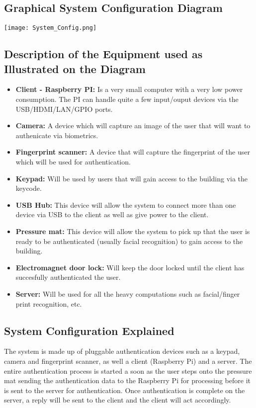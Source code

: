 \subsection{Graphical System Configuration Diagram}

\texttt{[image: System\_Config.png]}

\subsection{Description of the Equipment used as Illustrated on the Diagram}
\begin{itemize}
\item \textbf{Client - Raspberry PI:} Is a very small computer with a very low power consumption. The PI can handle quite a few input/ouput devices via the USB/HDMI/LAN/GPIO ports.
\item \textbf{Camera:} A device which will capture an image of the user that will want to authenicate via biometrics.
\item \textbf{Fingerprint scanner:} A device that will capture the fingerprint of the user which will be used for authentication.
\item \textbf{Keypad:} Will be used by users that will gain access to the building via the keycode.
\item \textbf{USB Hub:} This device will allow the system to connect more than one device via USB to the client as well as give power to the client.
\item \textbf{Pressure mat:} This device will allow the system to pick up that the user is ready to be authenticated (usually facial recognition) to gain access to the building.
\item \textbf{Electromagnet door lock:} Will keep the door locked until the client has succesfully authenticated the user.
\item \textbf{ Server:} Will be used for all the heavy computations such as facial/finger print recognition, etc.
\end{itemize}

\subsection{System Configuration Explained}
The system is made up of pluggable authentication devices such as a keypad, camera and fingerprint scanner, as well a client (Raspberry Pi) and a server. The entire authentication process is started a soon as the user steps onto the pressure mat sending the authentication data to the Raspberry Pi for processing before it is sent to the server for authentication. Once authentication is complete on the server, a reply will be sent to the client and the client will act accordingly.

